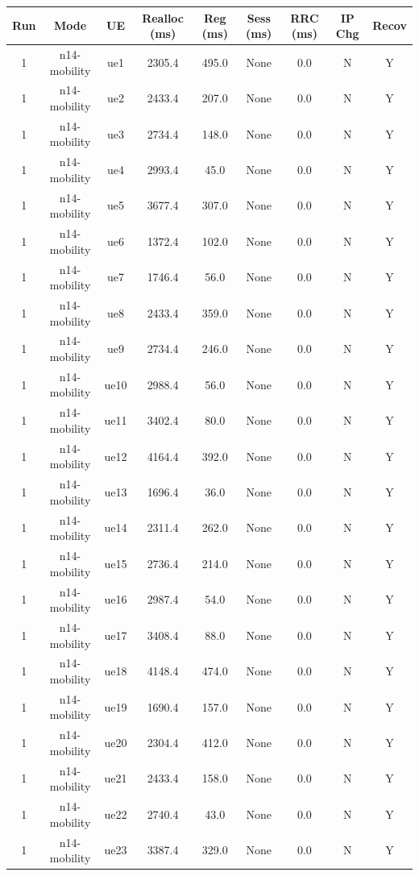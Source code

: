 \begin{table}[ht]
\centering
\begin{tabular}{|c|c|c|c|c|c|c|c|c|}
\hline
Run & Mode & UE & Realloc (ms) & Reg (ms) & Sess (ms) & RRC (ms) & IP Chg & Recov \\
\hline
1 & n14-mobility & ue1 & 2305.4 & 495.0 & None & 0.0 & N & Y \\
1 & n14-mobility & ue2 & 2433.4 & 207.0 & None & 0.0 & N & Y \\
1 & n14-mobility & ue3 & 2734.4 & 148.0 & None & 0.0 & N & Y \\
1 & n14-mobility & ue4 & 2993.4 & 45.0 & None & 0.0 & N & Y \\
1 & n14-mobility & ue5 & 3677.4 & 307.0 & None & 0.0 & N & Y \\
1 & n14-mobility & ue6 & 1372.4 & 102.0 & None & 0.0 & N & Y \\
1 & n14-mobility & ue7 & 1746.4 & 56.0 & None & 0.0 & N & Y \\
1 & n14-mobility & ue8 & 2433.4 & 359.0 & None & 0.0 & N & Y \\
1 & n14-mobility & ue9 & 2734.4 & 246.0 & None & 0.0 & N & Y \\
1 & n14-mobility & ue10 & 2988.4 & 56.0 & None & 0.0 & N & Y \\
1 & n14-mobility & ue11 & 3402.4 & 80.0 & None & 0.0 & N & Y \\
1 & n14-mobility & ue12 & 4164.4 & 392.0 & None & 0.0 & N & Y \\
1 & n14-mobility & ue13 & 1696.4 & 36.0 & None & 0.0 & N & Y \\
1 & n14-mobility & ue14 & 2311.4 & 262.0 & None & 0.0 & N & Y \\
1 & n14-mobility & ue15 & 2736.4 & 214.0 & None & 0.0 & N & Y \\
1 & n14-mobility & ue16 & 2987.4 & 54.0 & None & 0.0 & N & Y \\
1 & n14-mobility & ue17 & 3408.4 & 88.0 & None & 0.0 & N & Y \\
1 & n14-mobility & ue18 & 4148.4 & 474.0 & None & 0.0 & N & Y \\
1 & n14-mobility & ue19 & 1690.4 & 157.0 & None & 0.0 & N & Y \\
1 & n14-mobility & ue20 & 2304.4 & 412.0 & None & 0.0 & N & Y \\
1 & n14-mobility & ue21 & 2433.4 & 158.0 & None & 0.0 & N & Y \\
1 & n14-mobility & ue22 & 2740.4 & 43.0 & None & 0.0 & N & Y \\
1 & n14-mobility & ue23 & 3387.4 & 329.0 & None & 0.0 & N & Y \\

\end{tabular}
\end{table}
